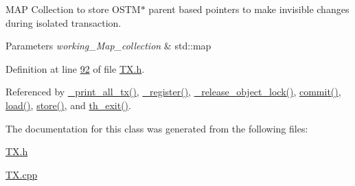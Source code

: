 M\+AP Collection to store O\+S\+T\+M$\ast$ parent based pointers to make invisible changes during isolated transaction. 


\begin{DoxyParams}{Parameters}
{\em working\+\_\+\+Map\+\_\+collection} & std\+::map \\
\hline
\end{DoxyParams}


Definition at line \hyperlink{_t_x_8h_source_l00092}{92} of file \hyperlink{_t_x_8h_source}{T\+X.\+h}.



Referenced by \hyperlink{_t_x_8cpp_source_l00346}{\+\_\+print\+\_\+all\+\_\+tx()}, \hyperlink{_t_x_8cpp_source_l00104}{\+\_\+register()}, \hyperlink{_t_x_8cpp_source_l00286}{\+\_\+release\+\_\+object\+\_\+lock()}, \hyperlink{_t_x_8cpp_source_l00202}{commit()}, \hyperlink{_t_x_8cpp_source_l00155}{load()}, \hyperlink{_t_x_8cpp_source_l00178}{store()}, and \hyperlink{_t_x_8cpp_source_l00052}{th\+\_\+exit()}.



The documentation for this class was generated from the following files\+:\begin{DoxyCompactItemize}
\item 
\hyperlink{_t_x_8h}{T\+X.\+h}\item 
\hyperlink{_t_x_8cpp}{T\+X.\+cpp}\end{DoxyCompactItemize}
